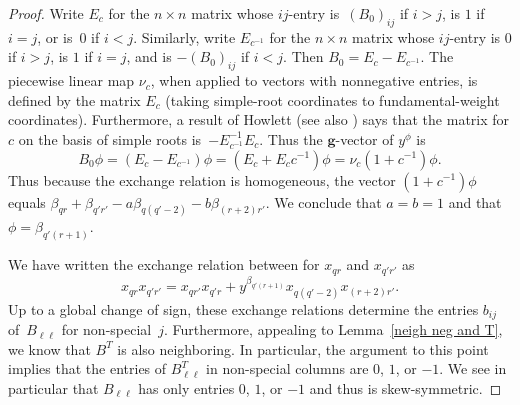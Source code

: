 \documentclass{amsart}
\theoremstyle{definition}
\theoremstyle{remark}
\numberwithin{equation}{section}
\newcommand{\0}{{\mathbf{0}}}
\newcommand{\g}{\mathbf{g}}
\begin{document}
\begin{proof}
Write $E_c$ for the $n\times n$ matrix whose $ij$-entry is~$(B_0)_{ij}$ if $i>j$, is $1$ if $i=j$, or is~$0$ if $i<j$.
Similarly, write $E_{c^{-1}}$ for the $n\times n$ matrix whose $ij$-entry is $0$ if $i>j$, is $1$ if $i=j$, and is $-(B_0)_{ij}$ if $i<j$.
Then $B_0=E_c-E_{c^{-1}}$.
The piecewise linear map $\nu_c$, when applied to vectors with nonnegative entries, is defined by the matrix $E_c$ (taking simple-root coordinates to fundamental-weight coordinates).
Furthermore, a result of Howlett \cite[Theorem~2.1]{Howlett} (see also \cite[Theorem~2.6]{affdenom}) says that the matrix for $c$ on the basis of simple roots is~$-E_{c^{-1}}^{-1}E_c$.
Thus the $\g$-vector of $y^\phi$ is 
\[B_0\phi=(E_c-E_{c^{-1}})\phi=(E_c+E_cc^{-1})\phi=\nu_c(1+c^{-1})\phi.\]
Thus because the exchange relation is homogeneous, the vector $(1+c^{-1})\phi$ equals $\beta_{qr}+\beta_{q'r'}-a\beta_{q(q'-2)}-b\beta_{(r+2)r'}$.
We conclude that $a=b=1$ and that $\phi=\beta_{q'(r+1)}$.

We have written the exchange relation between for $x_{qr}$ and $x_{q'r'}$ as 
\begin{equation}\label{exch rel eq}
x_{qr}x_{q'r'}=x_{qr'}x_{q'r}+y^{\beta_{q'(r+1)}}x_{q(q'-2)}x_{(r+2)r'}.
\end{equation}
Up to a global change of sign, these exchange relations determine the entries $b_{ij}$ of~$B_{\ell\ell}$ for non-special~$j$.
Furthermore, appealing to Lemma~\ref{neigh neg and T}, we know that $B^T$ is also neighboring.
In particular, the argument to this point implies that the entries of $B_{\ell\ell}^T$ in non-special columns are $0$, $1$, or $-1$.
We see in particular that $B_{\ell\ell}$ has only entries $0$, $1$, or $-1$ and thus is skew-symmetric. %


\end{proof}
\end{document}

